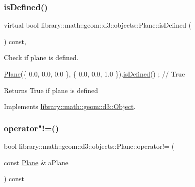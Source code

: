 \subsubsection{\texorpdfstring{is\+Defined()}{isDefined()}}
{\footnotesize\ttfamily virtual bool library\+::math\+::geom\+::d3\+::objects\+::\+Plane\+::is\+Defined (\begin{DoxyParamCaption}{ }\end{DoxyParamCaption}) const\hspace{0.3cm}{\ttfamily [override]}, {\ttfamily [virtual]}}



Check if plane is defined. 


\begin{DoxyCode}
\hyperlink{classlibrary_1_1math_1_1geom_1_1d3_1_1objects_1_1_plane_a81fe78a983e2cb6ee6ad9bfabd22c3a4}{Plane}(\{ 0.0, 0.0, 0.0 \}, \{ 0.0, 0.0, 1.0 \}).\hyperlink{classlibrary_1_1math_1_1geom_1_1d3_1_1objects_1_1_plane_a151515bf70e661c008023672e716e10a}{isDefined}() ; \textcolor{comment}{// True}
\end{DoxyCode}


\begin{DoxyReturn}{Returns}
True if plane is defined 
\end{DoxyReturn}


Implements \hyperlink{classlibrary_1_1math_1_1geom_1_1d3_1_1_object_a2216442e322f0c3ca5f01a4efa22baf7}{library\+::math\+::geom\+::d3\+::\+Object}.

\mbox{\label{classlibrary_1_1math_1_1geom_1_1d3_1_1objects_1_1_plane_a5dfafb90b0da2cc239092ea6c655ec2a}} 
\subsubsection{\texorpdfstring{operator"!=()}{operator!=()}}
{\footnotesize\ttfamily bool library\+::math\+::geom\+::d3\+::objects\+::\+Plane\+::operator!= (\begin{DoxyParamCaption}\item[{const \hyperlink{classlibrary_1_1math_1_1geom_1_1d3_1_1objects_1_1_plane}{Plane} \&}]{a\+Plane }\end{DoxyParamCaption}) const}



